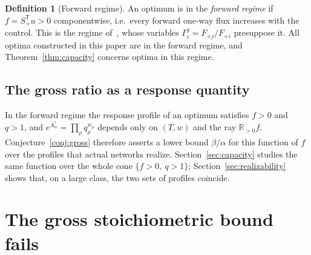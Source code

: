 \documentclass[11pt,reqno]{amsart}
\theoremstyle{plain}
\theoremstyle{definition}
\newtheorem{definition}[theorem]{Definition}
\theoremstyle{remark}
\numberwithin{equation}{section}
\newcommand{\R}{\mathbb{R}}
\newcommand{\Sp}{S_{+}}
\newcommand{\T}{\mathsf{T}}
\begin{document}
\begin{definition}[Forward regime]\label{def:forward}
An optimum is in the \emph{forward regime} if $f=\Sp^{\T}u>0$ componentwise, i.e.\ every forward one-way flux increases with the control.  This is the regime of~\cite[Supplementary Note~11]{DDL24}, whose variables $\Gamma^j_i=F_{+j}/F_{+i}$ presuppose it.  All optima constructed in this paper are in the forward regime, and Theorem~\ref{thm:capacity} concerns optima in this regime.
\end{definition}

\subsection{The gross ratio as a response quantity}
In the forward regime the response profile of an optimum satisfies $f>0$ and $q>1$, and $e^{A^*_w}=\prod_\rho q_\rho^{w_\rho}$ depends only on $(T,w)$ and the ray $\R_{>0}f$.  Conjecture~\ref{conj:gross} therefore asserts a lower bound $\beta/\alpha$ for this function of $f$ over the profiles that actual networks realize.  Section~\ref{sec:capacity} studies the same function over the whole cone $\{f>0,\ q>1\}$; Section~\ref{sec:realizability} shows that, on a large class, the two sets of profiles coincide.

\section{The gross stoichiometric bound fails}\label{sec:counterexample}
\end{document}
